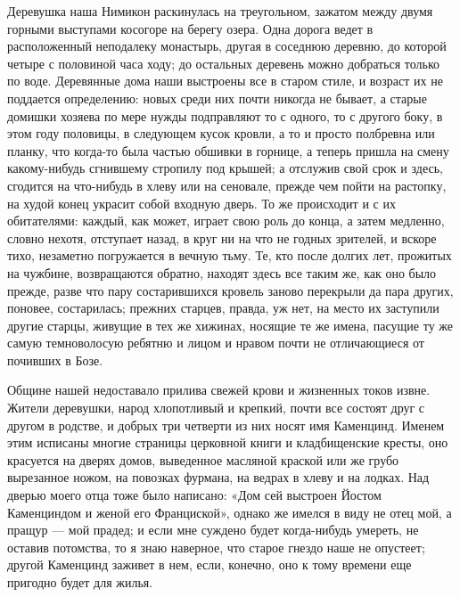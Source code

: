 Деревушка наша Нимикон раскинулась на треугольном, зажатом между двумя
горными  выступами  косогоре на  берегу  озера.  Одна дорога  ведет  в
расположенный  неподалеку монастырь,  другая  в  соседнюю деревню,  до
которой  четыре с  половиной часа  ходу; до  остальных деревень  можно
добраться только по воде. Деревянные  дома наши выстроены все в старом
стиле, и  возраст их не  поддается определению: новых среди  них почти
никогда не бывает, а старые  домишки хозяева по мере нужды подправляют
то с  одного, то  с другого  боку, в этом  году половицы,  в следующем
кусок кровли,  а то и просто  полбревна или планку, что  когда-то была
частью  обшивки в  горнице,  а теперь  пришла  на смену  какому-нибудь
сгнившему стропилу под крышей; а  отслужив свой срок и здесь, сгодится
на что-нибудь в  хлеву или на сеновале, прежде чем  пойти на растопку,
на худой  конец украсит собой входную  дверь. То же происходит  и с их
обитателями: каждый,  как может,  играет свою роль  до конца,  а затем
медленно, словно нехотя,  отступает назад, в круг ни на  что не годных
зрителей, и вскоре тихо, незаметно  погружается в вечную тьму. Те, кто
после долгих  лет, прожитых на чужбине,  возвращаются обратно, находят
здесь все таким же, как оно  было прежде, разве что пару состарившихся
кровель заново перекрыли да пара других, поновее, состарилась; прежних
старцев,  правда,  уж  нет,  на  место  их  заступили  другие  старцы,
живущие в  тех же хижинах,  носящие те же  имена, пасущие ту  же самую
темноволосую  ребятню  и  лицом  и нравом  почти  не  отличающиеся  от
почивших в Бозе.

Общине нашей недоставало прилива свежей крови и жизненных токов извне.
Жители деревушки, народ хлопотливый и  крепкий, почти все состоят друг
с другом в родстве, и добрых  три четверти из них носят имя Каменцинд.
Именем этим  исписаны многие страницы церковной  книги и кладбищенские
кресты, оно красуется на дверях домов, выведенное масляной краской или
же грубо вырезанное ножом, на повозках фурмана, на ведрах в хлеву и на
лодках. Над  дверью моего отца  тоже было написано: «Дом  сей выстроен
Йостом Каменциндом и женой его Франциской», однако же имелся в виду не
отец  мой,  а  пращур  ---  мой  прадед;  и  если  мне  суждено  будет
когда-нибудь умереть,  не оставив потомства,  то я знаю  наверное, что
старое гнездо наше не опустеет;  другой Каменцинд заживет в нем, если,
конечно, оно к тому времени еще пригодно будет для жилья.

